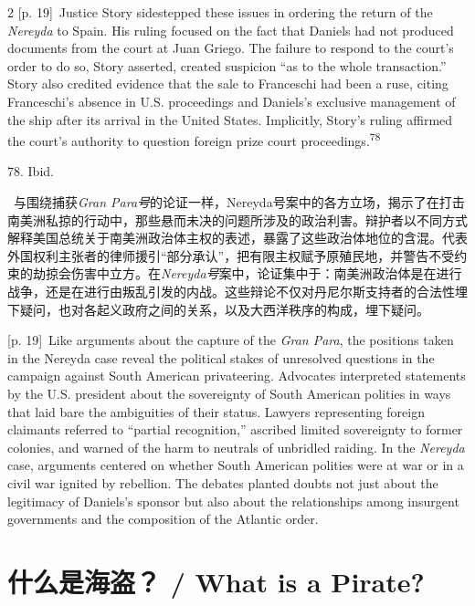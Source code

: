 \documentclass[10pt,a4paper]{article}
\begin{document}
\begin{paracol}{2}
\switchcolumn
{\scriptsize\color{gray} [p. 19]}\ Justice Story sidestepped these issues in ordering the return of the \textit{Nereyda} to Spain. His ruling focused on the fact that Daniels had not produced documents from the court at Juan Griego. The failure to respond to the court’s order to do so, Story asserted, created suspicion “as to the whole transaction.” Story also credited evidence that the sale to Franceschi had been a ruse, citing Franceschi’s absence in U.S. proceedings and Daniels’s exclusive management of the ship after its arrival in the United States. Implicitly, Story’s ruling affirmed the court’s authority to question foreign prize court proceedings.\nobreak\textsuperscript{78}\par{\small 78. Ibid.\par}
\switchcolumn*
{\scriptsize\color{gray} [p. 19]}\ 与围绕捕获\textit{Gran Para号}的论证一样，Nereyda号案中的各方立场，揭示了在打击南美洲私掠的行动中，那些悬而未决的问题所涉及的政治利害。辩护者以不同方式解释美国总统关于南美洲政治体主权的表述，暴露了这些政治体地位的含混。代表外国权利主张者的律师援引“部分承认”，把有限主权赋予原殖民地，并警告不受约束的劫掠会伤害中立方。在\textit{Nereyda号}案中，论证集中于：南美洲政治体是在进行战争，还是在进行由叛乱引发的内战。这些辩论不仅对丹尼尔斯支持者的合法性埋下疑问，也对各起义政府之间的关系，以及大西洋秩序的构成，埋下疑问。\par
\switchcolumn
{\scriptsize\color{gray} [p. 19]}\ Like arguments about the capture of the \textit{Gran Para}, the positions taken in the Nereyda case reveal the political stakes of unresolved questions in the campaign against South American privateering. Advocates interpreted statements by the U.S. president about the sovereignty of South American polities in ways that laid bare the ambiguities of their status. Lawyers representing foreign claimants referred to “partial recognition,” ascribed limited sovereignty to former colonies, and warned of the harm to neutrals of unbridled raiding. In the \textit{Nereyda} case, arguments centered on whether South American polities were at war or in a civil war ignited by rebellion. The debates planted doubts not just about the legitimacy of Daniels’s sponsor but also about the relationships among insurgent governments and the composition of the Atlantic order.\par
\switchcolumn*
\end{paracol}
\section*{什么是海盗？ / What is a Pirate?}
\end{document}
